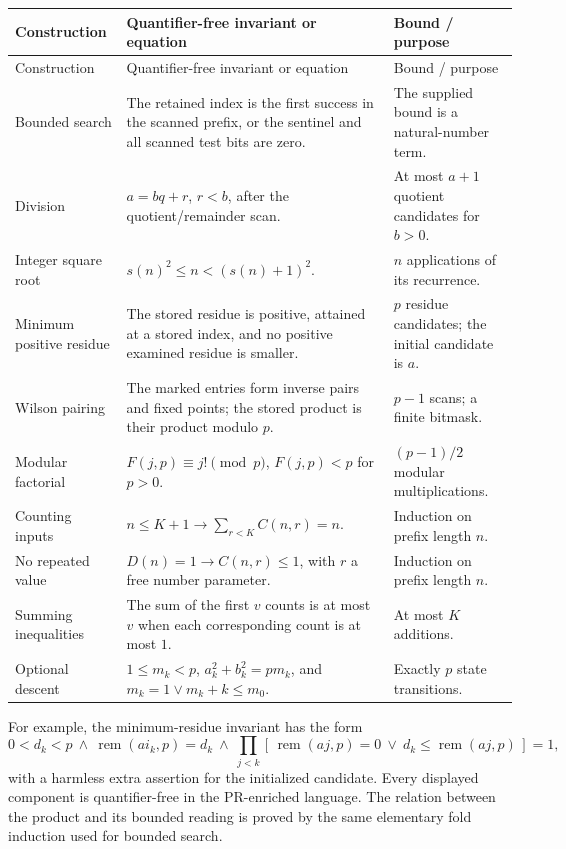 \documentclass[11pt,letterpaper]{article}
\theoremstyle{definition}
\theoremstyle{remark}
\newcommand{\remd}{\operatorname{rem}}
\newcommand{\ind}[1]{[\,#1\,]}
\begin{document}
\begin{longtable}{@{}>{\raggedright\arraybackslash}p{}>{\raggedright\arraybackslash}p{}>{\raggedright\arraybackslash}p{}@{}}
\toprule
Construction & Quantifier-free invariant or equation & Bound / purpose\\
\midrule
\endfirsthead
\toprule Construction & Quantifier-free invariant or equation & Bound / purpose\\
\midrule
\endhead
Bounded search &
The retained index is the first success in the scanned prefix, or the
sentinel and all scanned test bits are zero. &
The supplied bound is a natural-number term.\\
\addlinespace
Division &
\(a=bq+r\), \(r<b\), after the quotient/remainder scan. &
At most \(a+1\) quotient candidates for \(b>0\).\\
\addlinespace
Integer square root &
\(s(n)^2\le n<(s(n)+1)^2\). &
\(n\) applications of its recurrence.\\
\addlinespace
Minimum positive residue &
The stored residue is positive, attained at a stored index, and no
positive examined residue is smaller. &
\(p\) residue candidates; the initial candidate is \(a\).\\
\addlinespace
Wilson pairing &
The marked entries form inverse pairs and fixed points; the stored
product is their product modulo \(p\). &
\(p-1\) scans; a finite bitmask.\\
\addlinespace
Modular factorial &
\(F(j,p)\equiv j!\pmod p\), \(F(j,p)<p\) for \(p>0\). &
\((p-1)/2\) modular multiplications.\\
\addlinespace
Counting inputs &
\(n\le K+1\to\sum_{r<K}C(n,r)=n\). &
Induction on prefix length \(n\).\\
\addlinespace
No repeated value &
\(D(n)=1\to C(n,r)\le1\), with \(r\) a free number parameter. &
Induction on prefix length \(n\).\\
\addlinespace
Summing inequalities &
The sum of the first \(v\) counts is at most \(v\) when each corresponding
count is at most \(1\). &
At most \(K\) additions.\\
\addlinespace
Optional descent &
\(1\le m_k<p\), \(a_k^2+b_k^2=pm_k\), and
\(m_k=1\vee m_k+k\le m_0\). &
Exactly \(p\) state transitions.\\
\bottomrule
\end{longtable}

For example, the minimum-residue invariant has the form
\[
 0<d_k<p\ \wedge\ \remd(ai_k,p)=d_k\ \wedge\
 \prod_{j<k}
 \ind{\remd(aj,p)=0\ \vee\ d_k\le\remd(aj,p)}=1,
\]
with a harmless extra assertion for the initialized candidate.
Every displayed component is quantifier-free in the PR-enriched language.
The relation between the product and its bounded reading is proved by
the same elementary fold induction used for bounded search.
\end{document}
